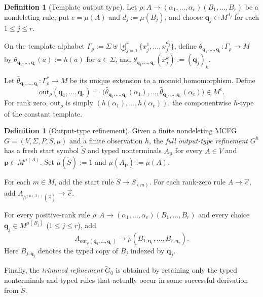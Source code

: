 \documentclass[11pt,a4paper]{article}
\numberwithin{equation}{section}
\theoremstyle{plain}
\theoremstyle{definition}
\newtheorem{definition}[theorem]{Definition}
\theoremstyle{remark}
\newcommand{\out}{\mathrm{out}}
\newcommand{\tuple}[1]{\vec{#1}}
\begin{document}
\begin{definition}[Template output type]
\label{def:output-map}
Let
\(\rho:A\to(\alpha_1,\ldots,\alpha_e)(B_1,\ldots,B_r)\)
be a nondeleting rule, put \(e=\mu(A)\) and
\(d_j:=\mu(B_j)\), and choose
\(\mathbf q_j\in M^{d_j}\) for each \(1\le j\le r\).

On the template alphabet
\(
  \Gamma_\rho
  :=\Sigma\uplus\biguplus_{j=1}^r
  \{x_j^1,\ldots,x_j^{d_j}\}
\),
define
\(\theta_{\mathbf q_1,\ldots,\mathbf q_r}\colon\Gamma_\rho\to M\)
by
\(\theta_{\mathbf q_1,\ldots,\mathbf q_r}(a):=h(a)\)
for \(a\in\Sigma\), and
\(\theta_{\mathbf q_1,\ldots,\mathbf q_r}(x_j^k):=(\mathbf q_j)_k\).

Let
\(
  \widehat\theta_{\mathbf q_1,\ldots,\mathbf q_r}
  \colon\Gamma_\rho^*\to M
\)
be its unique extension to a monoid homomorphism.
Define
\[
  \out_\rho(\mathbf q_1,\ldots,\mathbf q_r)
  :=
  \bigl(
    \widehat\theta_{\mathbf q_1,\ldots,\mathbf q_r}(\alpha_1),
    \ldots,
    \widehat\theta_{\mathbf q_1,\ldots,\mathbf q_r}(\alpha_e)
  \bigr)
  \in M^e.
\]
For rank zero, \(\out_\rho\) is simply
\((h(\alpha_1),\ldots,h(\alpha_e))\), the componentwise \(h\)-type of the
constant template.
\end{definition}

\begin{definition}[Output-type refinement]
\label{def:output-refinement}
Given a finite nondeleting MCFG \(G=(V,\Sigma,P,S,\mu)\) and a finite
observation \(h\), the \emph{full output-type refinement} \(G^h\) has a fresh
start symbol \(\widetilde S\) and typed nonterminals
\(A_{\mathbf p}\) for every \(A\in V\) and
\(\mathbf p\in M^{\mu(A)}\).
Set
\(\mu(\widetilde S):=1\) and
\(\mu(A_{\mathbf p}):=\mu(A)\).

For each \(m\in M\), add the start rule
\(\widetilde S\to S_{(m)}\).
For each rank-zero rule \(A\to\tuple c\), add
\(A_{h^{(\mu(A))}(\tuple c)}\to\tuple c\).

For every positive-rank rule
\(\rho:A\to(\alpha_1,\ldots,\alpha_e)(B_1,\ldots,B_r)\)
and every choice
\(\mathbf q_j\in M^{\mu(B_j)}\) (\(1\le j\le r\)), add
\[
  A_{\out_\rho(\mathbf q_1,\ldots,\mathbf q_r)}
  \to
  \rho(B_{1,\mathbf q_1},\ldots,B_{r,\mathbf q_r}).
\]
Here \(B_{j,\mathbf q_j}\) denotes the typed copy of \(B_j\) indexed by
\(\mathbf q_j\).

Finally, the \emph{trimmed refinement} \(\widetilde G_0\) is obtained by
retaining only the typed nonterminals and typed rules that actually occur in
some successful derivation from \(\widetilde S\).
\end{definition}
\end{document}
